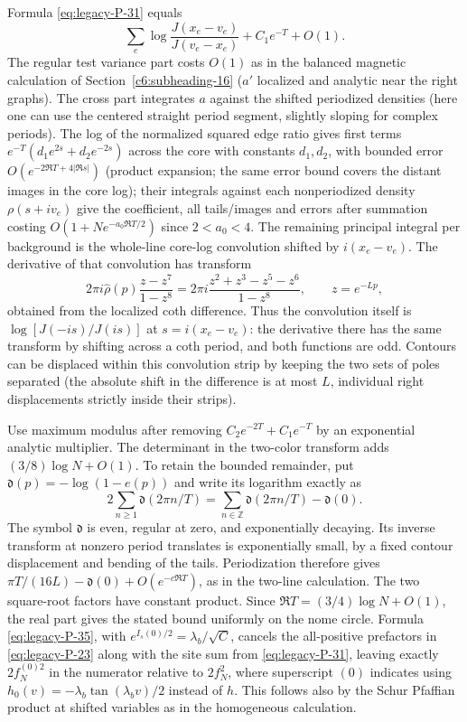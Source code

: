 Formula \eqref{eq:legacy-P-31} equals
\[
 \sum_e\log\frac{J(x_e-v_e)}{J(v_e-x_e)}
 + C_1 e^{-T}+O(1).
\]
The regular test variance part costs \(O(1)\) as in the balanced magnetic calculation of Section~\ref{c6:subheading-16} (\(a'\) localized and analytic near the right graphs). The cross part integrates \(a\) against the shifted periodized densities (here one can use the centered straight period segment, slightly sloping for complex periods). The log of the normalized squared edge ratio gives first terms \(e^{-T}(d_1 e^{2s}+d_2 e^{-2s})\) across the core with constants \(d_1,d_2\), with bounded error \(O(e^{-2\Re T+4|\Re s|})\) (product expansion; the same error bound covers the distant images in the core log); their integrals against each nonperiodized density \(\rho(s+i v_e)\) give the coefficient, all tails/images and errors after summation costing \(O(1+N e^{-a_0\Re T/2})\) since \(2<a_0<4\). The remaining principal integral per background is the whole-line core-log convolution shifted by \(i(x_e-v_e)\). The derivative of that convolution has transform
\[
 2\pi i\widehat\rho(p)\frac{z-z^7}{1-z^8}
 =2\pi i\frac{z^2+z^3-z^5-z^6}{1-z^8},\qquad z=e^{-Lp},
\]
obtained from the localized coth difference. Thus the convolution itself is \(\log[J(-is)/J(is)]\) at \(s=i(x_e-v_e)\): the derivative there has the same transform by shifting across a coth period, and both functions are odd. Contours can be displaced within this convolution strip by keeping the two sets of poles separated (the absolute shift in the difference is at most \(L\), individual right displacements strictly inside their strips).



Use maximum modulus after removing \(C_2 e^{-2T}+C_1e^{-T}\) by an exponential analytic multiplier. The determinant in the two-color transform adds
\((3/8)\log N+O(1)\). To retain the bounded remainder, put
$\mathfrak d(p)=-\log(1-e(p))$ and write its logarithm exactly as
\[
 2\sum_{n\ge1}\mathfrak d(2\pi n/T)
 =\sum_{n\in\mathbb Z}\mathfrak d(2\pi n/T)-\mathfrak d(0).
\]
The symbol $\mathfrak d$ is even, regular at zero, and exponentially
decaying. Its inverse transform at nonzero period translates is
exponentially small, by a fixed contour displacement and bending of
the tails. Periodization therefore gives
$\pi T/(16L)-\mathfrak d(0)+O(e^{-c\Re T})$, as in the two-line
calculation. The two square-root factors have constant product.
Since $\Re T=(3/4)\log N+O(1)$, the real part gives the stated bound
uniformly on the nome circle. Formula \eqref{eq:legacy-P-35}, with \(e^{I_s(0)/2}=\lambda_b/\sqrt C\), cancels the all-positive prefactors in \eqref{eq:legacy-P-23} along with the site sum from \eqref{eq:legacy-P-31}, leaving exactly \(2 f_N^{(0)2}\) in the numerator relative to \(2 f_N^2\), where superscript \((0)\) indicates using \(h_0(v)=-\lambda_b\tan(\lambda_b v)/2\) instead of \(h\). This follows also by the Schur Pfaffian product at shifted variables as in the homogeneous calculation.



